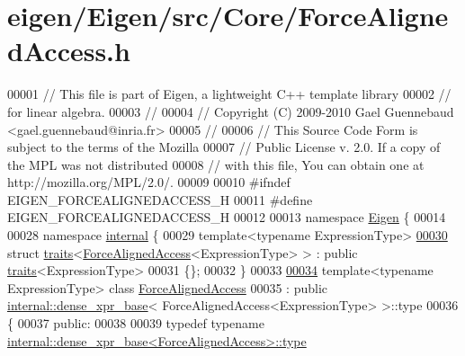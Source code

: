 \hypertarget{eigen_2_eigen_2src_2_core_2_force_aligned_access_8h_source}{}\section{eigen/\+Eigen/src/\+Core/\+Force\+Aligned\+Access.h}
\label{eigen_2_eigen_2src_2_core_2_force_aligned_access_8h_source}

\begin{DoxyCode}
00001 \textcolor{comment}{// This file is part of Eigen, a lightweight C++ template library}
00002 \textcolor{comment}{// for linear algebra.}
00003 \textcolor{comment}{//}
00004 \textcolor{comment}{// Copyright (C) 2009-2010 Gael Guennebaud <gael.guennebaud@inria.fr>}
00005 \textcolor{comment}{//}
00006 \textcolor{comment}{// This Source Code Form is subject to the terms of the Mozilla}
00007 \textcolor{comment}{// Public License v. 2.0. If a copy of the MPL was not distributed}
00008 \textcolor{comment}{// with this file, You can obtain one at http://mozilla.org/MPL/2.0/.}
00009 
00010 \textcolor{preprocessor}{#ifndef EIGEN\_FORCEALIGNEDACCESS\_H}
00011 \textcolor{preprocessor}{#define EIGEN\_FORCEALIGNEDACCESS\_H}
00012 
00013 \textcolor{keyword}{namespace }\hyperlink{namespace_eigen}{Eigen} \{
00014 
00028 \textcolor{keyword}{namespace }\hyperlink{namespaceinternal}{internal} \{
00029 \textcolor{keyword}{template}<\textcolor{keyword}{typename} ExpressionType>
\hyperlink{struct_eigen_1_1internal_1_1traits_3_01_force_aligned_access_3_01_expression_type_01_4_01_4}{00030} \textcolor{keyword}{struct }\hyperlink{struct_eigen_1_1internal_1_1traits}{traits}<\hyperlink{group___core___module_class_eigen_1_1_force_aligned_access}{ForceAlignedAccess}<ExpressionType> > : \textcolor{keyword}{public} 
      \hyperlink{struct_eigen_1_1internal_1_1traits}{traits}<ExpressionType>
00031 \{\};
00032 \}
00033 
\hyperlink{group___core___module}{00034} \textcolor{keyword}{template}<\textcolor{keyword}{typename} ExpressionType> \textcolor{keyword}{class }\hyperlink{group___core___module_class_eigen_1_1_force_aligned_access}{ForceAlignedAccess}
00035   : \textcolor{keyword}{public} \hyperlink{struct_eigen_1_1internal_1_1dense__xpr__base}{internal::dense\_xpr\_base}< ForceAlignedAccess<ExpressionType> >::type
00036 \{
00037   \textcolor{keyword}{public}:
00038 
00039     \textcolor{keyword}{typedef} \textcolor{keyword}{typename} \hyperlink{struct_eigen_1_1internal_1_1dense__xpr__base}{internal::dense\_xpr\_base<ForceAlignedAccess>::type}

\end{DoxyCode}
